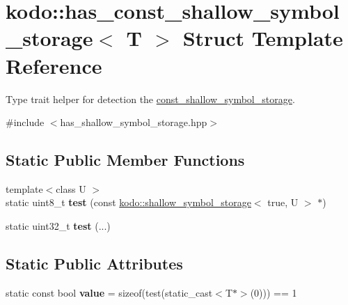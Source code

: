 \hypertarget{structkodo_1_1has__const__shallow__symbol__storage}{\section{kodo\-:\-:has\-\_\-const\-\_\-shallow\-\_\-symbol\-\_\-storage$<$ T $>$ Struct Template Reference}
\label{structkodo_1_1has__const__shallow__symbol__storage}
}


Type trait helper for detection the \hyperlink{classkodo_1_1const__shallow__symbol__storage}{const\-\_\-shallow\-\_\-symbol\-\_\-storage}.  




{\ttfamily \#include $<$has\-\_\-shallow\-\_\-symbol\-\_\-storage.\-hpp$>$}

\subsection*{Static Public Member Functions}
\begin{DoxyCompactItemize}
\item 
\hypertarget{structkodo_1_1has__const__shallow__symbol__storage_afa675afa4684cc1d47c386ab4055a33a}{{\footnotesize template$<$class U $>$ }\\static uint8\-\_\-t {\bfseries test} (const \hyperlink{classkodo_1_1shallow__symbol__storage}{kodo\-::shallow\-\_\-symbol\-\_\-storage}$<$ true, U $>$ $\ast$)}\label{structkodo_1_1has__const__shallow__symbol__storage_afa675afa4684cc1d47c386ab4055a33a}

\item 
\hypertarget{structkodo_1_1has__const__shallow__symbol__storage_a097c1f515e60f839a5565408fb9920b9}{static uint32\-\_\-t {\bfseries test} (...)}\label{structkodo_1_1has__const__shallow__symbol__storage_a097c1f515e60f839a5565408fb9920b9}

\end{DoxyCompactItemize}
\subsection*{Static Public Attributes}
\begin{DoxyCompactItemize}
\item 
\hypertarget{structkodo_1_1has__const__shallow__symbol__storage_a093bcb7061cabfe6b7e0aa7ab999d604}{static const bool {\bfseries value} = sizeof(test(static\-\_\-cast$<$T$\ast$$>$(0))) == 1}\label{structkodo_1_1has__const__shallow__symbol__storage_a093bcb7061cabfe6b7e0aa7ab999d604}

\end{DoxyCompactItemize}


